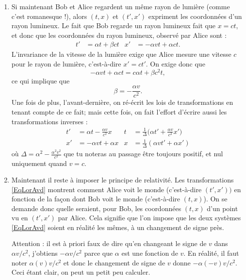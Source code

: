 \begin{enumerate}
	\item Si maintenant Bob et Alice regardent un même rayon de lumière (comme c'est romanesque !), alors \( (t,x)\) et \( (t',x')\) expriment les coordonnées d'un rayon lumineux. Le fait que Bob regarde un rayon lumineux fait que \( x=ct\), et donc que les coordonnées du rayon lumineux, observé par Alice sont :
	      \begin{align}
		      t' & =\alpha t+\beta ct & x' & =-\alpha v t+\alpha c t.
	      \end{align}
	      L'invariance de la vitesse de la lumière exige que Alice mesure une vitesse \( c\) pour le rayon de lumière, c'est-à-dire \( x'=ct'\). On exige donc que
	      \[
		      -\alpha v t+\alpha ct=c\alpha t+\beta c^2t,
	      \]
	      ce qui implique que
	      \[
		      \beta=-\frac{ \alpha v }{ c^2 }.
	      \]
	      Une fois de plus, l'avant-dernière,  on ré-écrit les lois de transformations en tenant compte de ce fait; mais cette fois, on fait l'effort d'écrire aussi les transformations inverses :
	      \begin{align}	\label{EqLorAvd}
		      t' & =\alpha t-\frac{ \alpha v }{ c^2 }x & t & =\frac{1}{ \Delta }\big( \alpha t'+\frac{ \alpha v }{ c^2 }x' \big) \\
		      x' & =-\alpha vt+\alpha x                & x & =\frac{1}{ \Delta }(\alpha v t'+\alpha x')
	      \end{align}
	      où \( \Delta=\alpha^2-\frac{ \alpha^2 v^2 }{ c^2 }\) que tu noteras au passage être toujours positif, et nul uniquement quand \( v=c\).

	\item Maintenant il reste à imposer le principe de relativité. Les transformations \eqref{EqLorAvd} montrent comment Alice voit le monde (c'est-à-dire \( (t',x'))\) en fonction de la façon dont Bob voit le monde (c'est-à-dire \( (t,x)\)). On se demande donc quelle seraient, pour Bob, les coordonnées \( (t,x)\) d'un point vu en \( (t',x')\) par Alice. Cela signifie que l'on impose que les deux systèmes \eqref{EqLorAvd} soient en réalité les mêmes, à un changement de signe près.

	      Attention : il est à priori faux de dire qu'en changeant le signe de \( v\) dans \( \alpha v/c^2\), j'obtiens \( -\alpha v/c^2\) parce que \( \alpha\) est une fonction de \( v\). En réalité, il faut noter \( \alpha(v)v/c^2\) et donc le changement de signe de \( v\) donne \( -\alpha(-v)v/c^2\). Ceci étant clair, on peut un petit peu calculer.


\end{enumerate}
